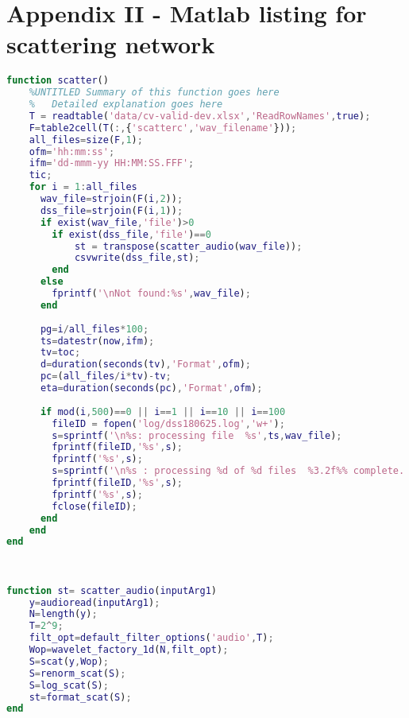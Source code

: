 
\section*{Appendix II - Matlab listing for scattering network}
\begin{lstlisting}[language=Matlab]
function scatter()
    %UNTITLED Summary of this function goes here
    %   Detailed explanation goes here
    T = readtable('data/cv-valid-dev.xlsx','ReadRowNames',true);
    F=table2cell(T(:,{'scatterc','wav_filename'}));
    all_files=size(F,1);
    ofm='hh:mm:ss';
    ifm='dd-mmm-yy HH:MM:SS.FFF';
    tic;
    for i = 1:all_files
      wav_file=strjoin(F(i,2));
      dss_file=strjoin(F(i,1));
      if exist(wav_file,'file')>0
      	if exist(dss_file,'file')==0
        	st = transpose(scatter_audio(wav_file));
        	csvwrite(dss_file,st);
      	end
      else
      	fprintf('\nNot found:%s',wav_file);
      end
 
      pg=i/all_files*100;
      ts=datestr(now,ifm);
      tv=toc;
      d=duration(seconds(tv),'Format',ofm);
      pc=(all_files/i*tv)-tv;
      eta=duration(seconds(pc),'Format',ofm);
 
      if mod(i,500)==0 || i==1 || i==10 || i==100
      	fileID = fopen('log/dss180625.log','w+');
      	s=sprintf('\n%s: processing file  %s',ts,wav_file);
      	fprintf(fileID,'%s',s);
      	fprintf('%s',s);
      	s=sprintf('\n%s : processing %d of %d files  %3.2f%% complete.. time elapsed = %s, eta = %s',ts,i,all_files,pg,d,eta);
      	fprintf(fileID,'%s',s);
      	fprintf('%s',s);
      	fclose(fileID);
      end
    end
end
 

 
function st= scatter_audio(inputArg1)
    y=audioread(inputArg1);
    N=length(y);
    T=2^9;
    filt_opt=default_filter_options('audio',T);
    Wop=wavelet_factory_1d(N,filt_opt);
    S=scat(y,Wop);
    S=renorm_scat(S);
    S=log_scat(S);
    st=format_scat(S);
end

\end{lstlisting}